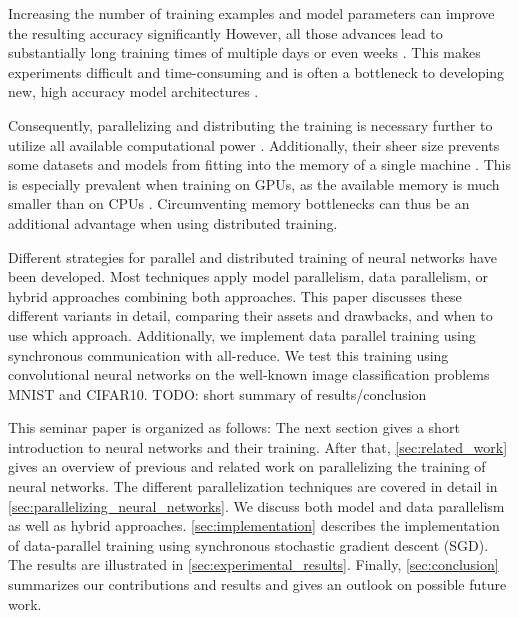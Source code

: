 \documentclass[conference,compsoc,a4paper]{IEEEtran}
\begin{document}
Increasing the number of training examples and model parameters can improve the resulting accuracy significantly \cite{dean2012-Large-scale-distributed}
However, all those advances lead to substantially long training times of multiple days or even weeks \cite{jin2016-How-to-scale,chilimbi2014-Project-Adam}.
This makes experiments difficult and time-consuming \cite{yadan2013-Multi-GPU-Training,jiang2018-FiLayer} and is often a bottleneck to developing new, high accuracy model architectures \cite{iandola2016-Firecaffe}.

Consequently, parallelizing and distributing the training is necessary further to utilize all available computational power \cite{jiang2018-FiLayer,recht2011-Hogwild}.
Additionally, their sheer size prevents some datasets and models from fitting into the memory of a single machine \cite{recht2011-Hogwild,dean2012-Large-scale-distributed}.
This is especially prevalent when training on GPUs, as the available memory is much smaller than on CPUs \cite{dean2012-Large-scale-distributed}.
Circumventing memory bottlenecks can thus be an additional advantage when using distributed training.

Different strategies for parallel and distributed training of neural networks have been developed.
Most techniques apply model parallelism, data parallelism, or hybrid approaches combining both approaches.
This paper discusses these different variants in detail, comparing their assets and drawbacks, and when to use which approach.
Additionally, we implement data parallel training using synchronous communication with all-reduce.
We test this training using convolutional neural networks on the well-known image classification problems MNIST and CIFAR10.
TODO: short summary of results/conclusion %

This seminar paper is organized as follows:
The next section gives a short introduction to neural networks and their training.
After that, \autoref{sec:related_work} gives an overview of previous and related work on parallelizing the training of neural networks.
The different parallelization techniques are covered in detail in \autoref{sec:parallelizing_neural_networks}.
We discuss both model and data parallelism as well as hybrid approaches.
\autoref{sec:implementation} describes the implementation of data-parallel training using synchronous stochastic gradient descent (SGD).
The results are illustrated in \autoref{sec:experimental_results}.
Finally, \autoref{sec:conclusion} summarizes our contributions and results and gives an outlook on possible future work.
\end{document}
